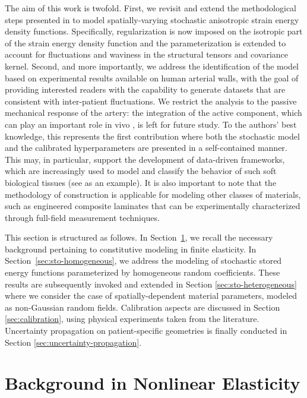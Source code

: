 The aim of this work is twofold. First, we revisit and extend the methodological steps presented in \cite{STABER201894} to model spatially-varying stochastic anisotropic strain energy density functions. Specifically, regularization is now imposed on the isotropic part of the strain energy density function and the parameterization is extended to account for fluctuations and waviness in the structural tensors and covariance kernel. Second, and more importantly, we address the identification of the model based on experimental results available on human arterial walls, with the goal of providing interested readers with the capability to generate datasets that are consistent with inter-patient fluctuations. We restrict the analysis to the passive mechanical response of the artery: the integration of the active component, which can play an important role in vivo \cite{YOSIBASH201251}, is left for future study. To the authors' best knowledge, this represents the first contribution where both the stochastic model and the calibrated hyperparameters are presented in a self-contained manner. This may, in particular, support the development of data-driven frameworks, which are increasingly used to model and classify the behavior of such soft biological tissues (see \cite{Holzapfel2021} as an example). It is also important to note that the methodology of construction is applicable for modeling other classes of materials, such as engineered composite laminates that can be experimentally characterized through full-field measurement techniques.

This section is structured as follows. In Section~\ref{sec:background-det-nonlin}, we recall the necessary background pertaining to constitutive modeling in finite elasticity. In Section~\ref{sec:sto-homogeneous}, we address the modeling of stochastic stored energy functions parameterized by homogeneous random coefficients. These results are subsequently invoked and extended in Section \ref{sec:sto-heterogeneous} where we consider the case of spatially-dependent material parameters, modeled as non-Gaussian random fields. Calibration aspects are discussed in Section \ref{sec:calibration}, using physical experiments taken from the literature. Uncertainty propagation on patient-specific geometries is finally conducted in Section \ref{sec:uncertainty-propagation}.

\section{Background in Nonlinear Elasticity}
\label{sec:background-det-nonlin}

